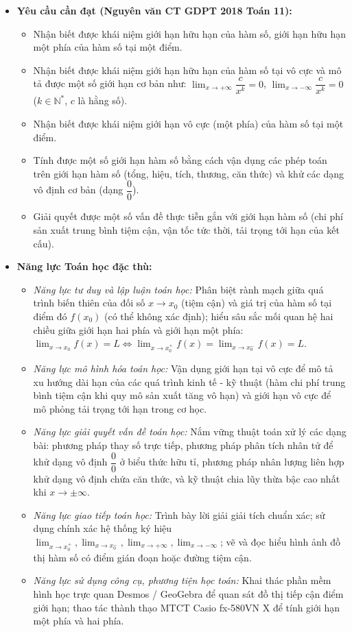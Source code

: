 \documentclass[12pt, a4paper]{article}
\begin{document}
\begin{itemize}[leftmargin=1.2cm]
    \item \textbf{Yêu cầu cần đạt (Nguyên văn CT GDPT 2018 Toán 11):}
    \begin{itemize}[leftmargin=0.6cm]
        \item Nhận biết được khái niệm giới hạn hữu hạn của hàm số, giới hạn hữu hạn một phía của hàm số tại một điểm.
        \item Nhận biết được khái niệm giới hạn hữu hạn của hàm số tại vô cực và mô tả được một số giới hạn cơ bản như: $\lim_{x \to +\infty} \dfrac{c}{x^k} = 0$, $\lim_{x \to -\infty} \dfrac{c}{x^k} = 0$ ($k \in \mathbb{N}^*$, $c$ là hằng số).
        \item Nhận biết được khái niệm giới hạn vô cực (một phía) của hàm số tại một điểm.
        \item Tính được một số giới hạn hàm số bằng cách vận dụng các phép toán trên giới hạn hàm số (tổng, hiệu, tích, thương, căn thức) và khử các dạng vô định cơ bản (dạng $\dfrac{0}{0}$).
        \item Giải quyết được một số vấn đề thực tiễn gắn với giới hạn hàm số (chi phí sản xuất trung bình tiệm cận, vận tốc tức thời, tải trọng tới hạn của kết cấu).
    \end{itemize}

    \item \textbf{Năng lực Toán học đặc thù:}
    \begin{itemize}[leftmargin=0.6cm]
        \item \textit{Năng lực tư duy và lập luận toán học:} Phân biệt rành mạch giữa quá trình biến thiên của đối số $x \to x_0$ (tiệm cận) và giá trị của hàm số tại điểm đó $f(x_0)$ (có thể không xác định); hiểu sâu sắc mối quan hệ hai chiều giữa giới hạn hai phía và giới hạn một phía: $\lim_{x \to x_0} f(x) = L \iff \lim_{x \to x_0^+} f(x) = \lim_{x \to x_0^-} f(x) = L$.
        \item \textit{Năng lực mô hình hóa toán học:} Vận dụng giới hạn tại vô cực để mô tả xu hướng dài hạn của các quá trình kinh tế - kỹ thuật (hàm chi phí trung bình tiệm cận khi quy mô sản xuất tăng vô hạn) và giới hạn vô cực để mô phỏng tải trọng tới hạn trong cơ học.
        \item \textit{Năng lực giải quyết vấn đề toán học:} Nắm vững thuật toán xử lý các dạng bài: phương pháp thay số trực tiếp, phương pháp phân tích nhân tử để khử dạng vô định $\dfrac{0}{0}$ ở biểu thức hữu tỉ, phương pháp nhân lượng liên hợp khử dạng vô định chứa căn thức, và kỹ thuật chia lũy thừa bậc cao nhất khi $x \to \pm\infty$.
        \item \textit{Năng lực giao tiếp toán học:} Trình bày lời giải giải tích chuẩn xác; sử dụng chính xác hệ thống ký hiệu $\lim_{x \to x_0^+}, \lim_{x \to x_0^-}, \lim_{x \to +\infty}, \lim_{x \to -\infty}$; vẽ và đọc hiểu hình ảnh đồ thị hàm số có điểm gián đoạn hoặc đường tiệm cận.
        \item \textit{Năng lực sử dụng công cụ, phương tiện học toán:} Khai thác phần mềm hình học trực quan Desmos / GeoGebra để quan sát đồ thị tiếp cận điểm giới hạn; thao tác thành thạo MTCT Casio fx-580VN X để tính giới hạn một phía và hai phía.
    \end{itemize}


\end{itemize}
\end{document}
